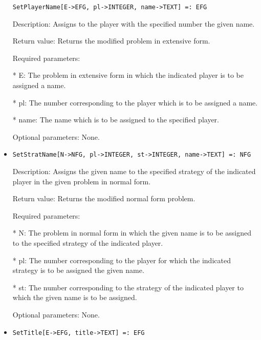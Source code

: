 \begin{itemize}
\begin{verbatim}
SetPlayerName[E->EFG, pl->INTEGER, name->TEXT] =: EFG
\end{verbatim}

\bd
\item
[Description:] Assigns to the player with the specified number the given
name.
\item
[Return value:] Returns the modified problem in extensive form.
\item
[Required parameters:]\hfil\null

\bd
\item
[* E:] The problem in extensive form in which the indicated player is
to be assigned a name.
\item
[* pl:] The number corresponding to the player which is to be 
assigned a name.
\item
[* name:] The name which is to be assigned to the specified player.
\ed
\item
[Optional parameters:] None.
\ed

\item

\begin{verbatim}
SetStratName[N->NFG, pl->INTEGER, st->INTEGER, name->TEXT] =: NFG
\end{verbatim}

\bd
\item
[Description:] Assigns the given name to the specified strategy of the
indicated player in the given problem in normal form.
\item
[Return value:] Returns the modified normal form problem.
\item
[Required parameters:]\hfil\null
	
\bd
\item
[* N:] The problem in normal form in which the given name is to be
assigned to the specified strategy of the indicated player.
\item
[* pl:] The number corresponding to the player for which the 
indicated strategy is to be assigned the given name.
\item
[* st:] The number corresponding to the strategy of the indicated 
player to which the given name is to be assigned.
\ed

\item
[Optional parameters:] None.

\ed

\item

\begin{verbatim}
SetTitle[E->EFG, title->TEXT] =: EFG
\end{verbatim}


\end{itemize}
